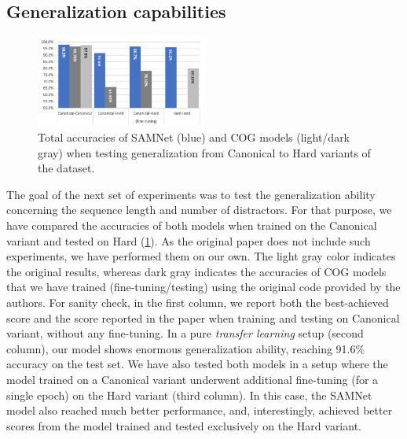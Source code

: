 \subsection{Generalization capabilities}

\begin{figure}
	\centering
	\includegraphics[width=0.5\textwidth]{../results/samnet_cog_overall_transfer.png}
	\caption{Total accuracies of SAMNet (blue) and COG models (light/dark gray) when testing generalization from Canonical to Hard variants of the dataset.}
	\label{fig:samnet_cog_overall_transfer}
\end{figure}

The goal of the next set of experiments was to test the generalization ability concerning the sequence length and number of distractors.
For that purpose, we have compared the accuracies of both models when trained on the Canonical variant and tested on Hard (\cref{fig:samnet_cog_overall_transfer}).
As the original paper does not include such experiments, we have performed them on our own.  The light gray color indicates the original results, whereas dark gray indicates the accuracies of COG models that we have trained (fine-tuning/testing) using the original code provided by the authors.
For sanity check, in the first column, we report both the best-achieved score and the score reported in the paper when training and testing on Canonical variant, without any fine-tuning.
In a pure \textit{transfer learning} setup (second column), our model shows enormous generalization ability, reaching 91.6\% accuracy on the test set.
We have also tested both models in a setup where the model trained on a Canonical variant underwent additional fine-tuning (for a single epoch) on the Hard variant (third column).
In this case, the SAMNet model also reached much better performance, and, interestingly, achieved better scores from the model trained and tested exclusively on the Hard variant.

